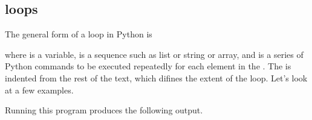 \documentclass[letterpaper,10pt,english]{sphinxmanual}
\begin{document}
\ignorespaces 

\subsection{ loops}
\label{\detokenize{chap6/chap6_loopsconds:for-loops}}\label{\detokenize{chap6/chap6_loopsconds:index-3}}
\sphinxAtStartPar
The general form of a  loop in Python is

\begin{sphinxVerbatim}[commandchars=\\\{\}]
   
\end{sphinxVerbatim}

\sphinxAtStartPar
where  is a variable,  is a sequence such as list or string or array, and  is a series of Python commands to be executed repeatedly for each element in the .  The  is indented from the rest of the text, which difines the extent of the loop.  Let’s look at a few examples.

\begin{sphinxVerbatim}[commandchars=\\\{\}]
   \PYG{p}{[}    \PYG{p}{]}
\end{sphinxVerbatim}

\sphinxAtStartPar
Running this program produces the following output.
\end{document}
